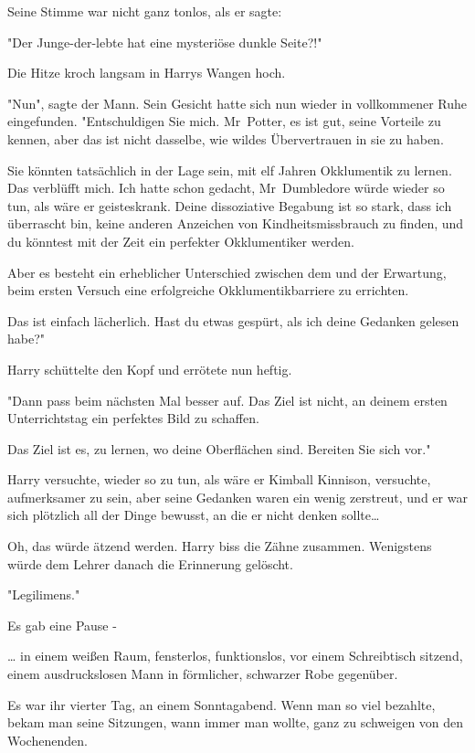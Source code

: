 {Seine Stimme war nicht ganz tonlos, als er sagte:

"Der Junge-der-lebte hat eine mysteriöse dunkle Seite?!"

Die Hitze kroch langsam in Harrys Wangen hoch.

"Nun", sagte der Mann. Sein Gesicht hatte sich nun wieder in vollkommener Ruhe eingefunden. "Entschuldigen Sie mich. Mr~Potter, es ist gut, seine Vorteile zu kennen, aber das ist nicht dasselbe, wie wildes Übervertrauen in sie zu haben.

Sie könnten tatsächlich in der Lage sein, mit elf Jahren Okklumentik zu lernen. Das verblüfft mich. Ich hatte schon gedacht, Mr~Dumbledore würde wieder so tun, als wäre er geisteskrank. Deine dissoziative Begabung ist so stark, dass ich überrascht bin, keine anderen Anzeichen von Kindheitsmissbrauch zu finden, und du könntest mit der Zeit ein perfekter Okklumentiker werden.

Aber es besteht ein erheblicher Unterschied zwischen dem und der Erwartung, beim ersten Versuch eine erfolgreiche Okklumentikbarriere zu errichten.

Das ist einfach lächerlich. Hast du etwas gespürt, als ich deine Gedanken gelesen habe?"

Harry schüttelte den Kopf und errötete nun heftig.

"Dann pass beim nächsten Mal besser auf. Das Ziel ist nicht, an deinem ersten Unterrichtstag ein perfektes Bild zu schaffen.

Das Ziel ist es, zu lernen, wo deine Oberflächen sind. Bereiten Sie sich vor."

Harry versuchte, wieder so zu tun, als wäre er Kimball Kinnison, versuchte, aufmerksamer zu sein, aber seine Gedanken waren ein wenig zerstreut, und er war sich plötzlich all der Dinge bewusst, an die er nicht denken sollte…

Oh, das würde ätzend werden. Harry biss die Zähne zusammen. Wenigstens würde dem Lehrer danach die Erinnerung gelöscht.

"Legilimens."

Es gab eine Pause -

… in einem weißen Raum, fensterlos, funktionslos, vor einem Schreibtisch sitzend, einem ausdruckslosen Mann in förmlicher, schwarzer Robe gegenüber.

Es war ihr vierter Tag, an einem Sonntagabend. Wenn man so viel bezahlte, bekam man seine Sitzungen, wann immer man wollte, ganz zu schweigen von den Wochenenden.

}
